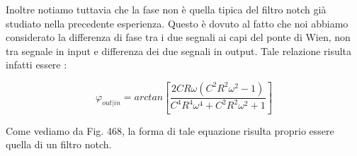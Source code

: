 Inoltre notiamo tuttavia che la fase non è quella tipica del filtro notch già studiato nella precedente esperienza. Questo è dovuto al fatto che noi abbiamo considerato la differenza di fase tra i due segnali ai capi del ponte di Wien, non tra segnale in input e differenza dei due segnali in output. Tale relazione risulta infatti essere :

\begin{equation}
\varphi_{out|in}=arctan[\frac{2 C R \omega \left(C^2 R^2 \omega^2-1\right)}{C^4 R^4 \omega^4+C^2 R^2 \omega^2+1}]
\end{equation}

\pagebreak

Come vediamo da Fig. 468, la forma di tale equazione risulta proprio essere quella di un filtro notch.





